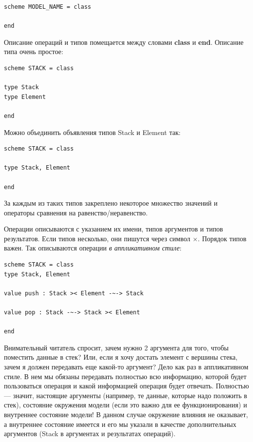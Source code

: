 \documentclass[14pt, twoside]{extreport}
\begin{document}
\begin{lstlisting}
scheme MODEL_NAME = class

end
\end{lstlisting}

Описание операций и типов помещается между словами \textbf{class} и \textbf{end}. Описание типа очень простое:

\begin{lstlisting}
scheme STACK = class

type Stack
type Element

end
\end{lstlisting}

Можно объединить объявления типов Stack и Element так:

\begin{lstlisting}
scheme STACK = class

type Stack, Element

end
\end{lstlisting}

За каждым из таких типов закреплено некоторое множество значений и операторы сравнения на равенство/неравенство.

Операции описываются с указанием их имени, типов аргументов и типов результатов. Если типов несколько, они пишутся через символ $\times$. Порядок типов важен. Так описываются операции \emph{в аппликативном стиле}:

\begin{lstlisting}
scheme STACK = class
type Stack, Element

value push : Stack >< Element -~-> Stack

value pop : Stack -~-> Stack >< Element

end
\end{lstlisting}

Внимательный читатель спросит, зачем нужно 2 аргумента для того, чтобы поместить данные в стек? Или, если я хочу достать элемент с вершины стека, зачем я должен передавать еще какой-то аргумент? Дело как раз в аппликативном стиле. В нем мы обязаны передавать полностью всю информацию, которой будет пользоваться операция и какой информацией операция будет отвечать. Полностью --- значит, настоящие аргументы (например, те данные, которые надо положить в стек), состояние окружения модели (если это важно для ее функционирования) и внутреннее состояние модели! В данном случае окружение влияния не оказывает, а внутреннее состояние имеется и его мы указали в качестве дополнительных аргументов (Stack в аргументах и результатах операций).
\end{document}
